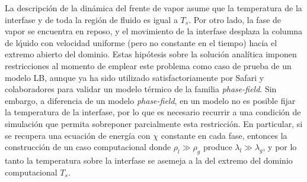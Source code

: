 La descripci\'on de la din\'amica del frente de vapor asume que la temperatura de la interfase y de toda la regi\'on de fluido es igual a $T_s$. Por otro lado, la fase de vapor se encuentra en reposo, y el movimiento de la interfase desplaza la columna de l\'quido con velocidad uniforme (pero no constante en el tiempo) hacia el extremo abierto del dominio. Estas hip\'otesis sobre la soluci\'on anal\'itica imponen restricciones al momento de emplear este problema como caso de prueba de un modelo LB, aunque ya ha sido utilizado satisfactoriamente por Safari y colaboradores \cite{safari_consistent_2014} para validar un modelo t\'ermico de la familia \emph{phase-field}. Sin embargo, a diferencia de un modelo \emph{phase-field}, en un modelo \pp{} no es posible fijar la temperatura de la interfase, por lo que es necesario recurrir a una condici\'on de simulaci\'on que permita sobreponer parcialmente esta restricci\'on. En particular, si se recupera una ecuaci\'on de energ\'ia con $\chi$ constante en cada fase, entonces la construcci\'on de un caso computacional donde $\rho_l \gg \rho_g$ produce $\lambda_l \gg \lambda_g$, y por lo tanto la temperatura sobre la interfase se asemeja a la del extremo del dominio computacional $T_s$.

